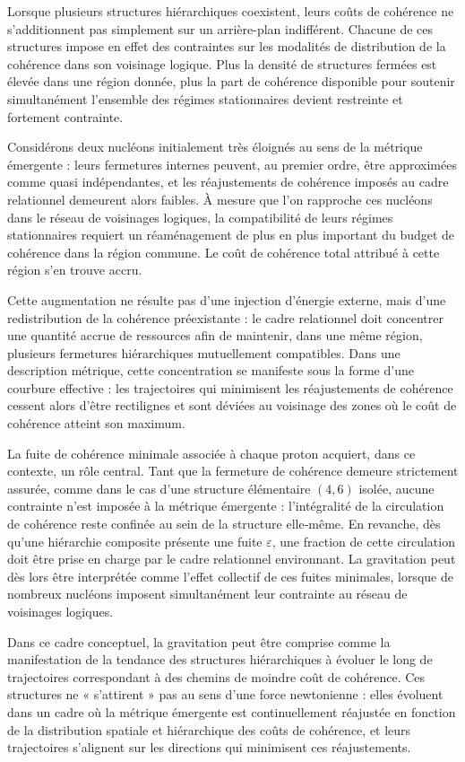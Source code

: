 \documentclass[11pt,a4paper]{article}
\begin{document}
Lorsque plusieurs structures hiérarchiques coexistent, leurs coûts de cohérence ne s’additionnent pas simplement sur un arrière-plan indifférent. Chacune de ces structures impose en effet des contraintes sur les modalités de distribution de la cohérence dans son voisinage logique. Plus la densité de structures fermées est élevée dans une région donnée, plus la part de cohérence disponible pour soutenir simultanément l’ensemble des régimes stationnaires devient restreinte et fortement contrainte.

Considérons deux nucléons initialement très éloignés au sens de la métrique émergente : leurs fermetures internes peuvent, au premier ordre, être approximées comme quasi indépendantes, et les réajustements de cohérence imposés au cadre relationnel demeurent alors faibles. À mesure que l’on rapproche ces nucléons dans le réseau de voisinages logiques, la compatibilité de leurs régimes stationnaires requiert un réaménagement de plus en plus important du budget de cohérence dans la région commune. Le coût de cohérence total attribué à cette région s’en trouve accru.

Cette augmentation ne résulte pas d’une injection d’énergie externe, mais d’une redistribution de la cohérence préexistante : le cadre relationnel doit concentrer une quantité accrue de ressources afin de maintenir, dans une même région, plusieurs fermetures hiérarchiques mutuellement compatibles. Dans une description métrique, cette concentration se manifeste sous la forme d’une courbure effective : les trajectoires qui minimisent les réajustements de cohérence cessent alors d’être rectilignes et sont déviées au voisinage des zones où le coût de cohérence atteint son maximum.

La fuite de cohérence minimale associée à chaque proton acquiert, dans ce contexte, un rôle central. Tant que la fermeture de cohérence demeure strictement assurée, comme dans le cas d’une structure élémentaire \((4,6)\) isolée, aucune contrainte n’est imposée à la métrique émergente : l’intégralité de la circulation de cohérence reste confinée au sein de la structure elle‑même. En revanche, dès qu’une hiérarchie composite présente une fuite \(\varepsilon\), une fraction de cette circulation doit être prise en charge par le cadre relationnel environnant. La gravitation peut dès lors être interprétée comme l’effet collectif de ces fuites minimales, lorsque de nombreux nucléons imposent simultanément leur contrainte au réseau de voisinages logiques.

Dans ce cadre conceptuel, la gravitation peut être comprise comme la manifestation de la tendance des structures hiérarchiques à évoluer le long de trajectoires correspondant à des chemins de moindre coût de cohérence. Ces structures ne « s’attirent » pas au sens d’une force newtonienne : elles évoluent dans un cadre où la métrique émergente est continuellement réajustée en fonction de la distribution spatiale et hiérarchique des coûts de cohérence, et leurs trajectoires s’alignent sur les directions qui minimisent ces réajustements.
\end{document}
